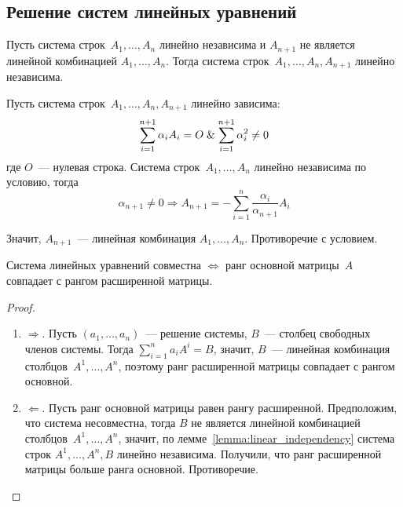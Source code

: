 \subsection{Решение систем линейных уравнений}
\begin{lemma}
\label{lemma:linear_independency}
Пусть система строк~$A_1, \ldots, A_n$ линейно независима и $A_{n+1}$ не является линейной комбинацией $A_1, \ldots, A_n$. Тогда система строк~$A_1, \ldots, A_n, A_{n+1}$ линейно независима.
\end{lemma}
\begin{proofcontra}
Пусть система строк~$A_1, \ldots, A_n, A_{n+1}$ линейно зависима:
\begin{equation*}
\sum_{i=1}^{n+1} \alpha_i A_i = O \mathrel{\&}
\sum_{i=1}^{n+1} \alpha_i^2 \neq 0
\end{equation*}
где $O$~--- нулевая строка.
Система строк~$A_1, \ldots, A_n$ линейно независима по условию, тогда
\begin{equation*}
\alpha_{n+1} \neq 0 \Rightarrow A_{n+1} = -\sum_{i=1}^n \frac{\alpha_i}{\alpha_{n+1}} A_i
\end{equation*}

Значит, $A_{n+1}$~--- линейная комбинация $A_1, \ldots, A_n$.
Противоречие с условием.
\end{proofcontra}

\begin{theorem}
Система линейных уравнений совместна $\Leftrightarrow$ ранг основной матрицы~$A$ совпадает с рангом расширенной матрицы.
\end{theorem}
\begin{proof}
\begin{enumerate}
	\item $\Rightarrow$. Пусть $(a_1, \ldots, a_n)$~--- решение системы, $B$~--- столбец свободных членов системы.
	Тогда $\sum\limits_{i=1}^n a_i A^i = B$, значит, $B$~--- линейная комбинация столбцов~$A^1, \ldots, A^n$, поэтому ранг расширенной матрицы совпадает с рангом основной.
	
	\item $\Leftarrow$. Пусть ранг основной матрицы равен рангу расширенной.
	Предположим, что система несовместна, тогда $B$ не является линейной комбинацией столбцов~$A^1, \ldots, A^n$, значит, по лемме~\ref*{lemma:linear_independency} система строк $A^1, \ldots, A^n, B$ линейно независима.
	Получили, что ранг расширенной матрицы больше ранга основной.
	Противоречие.
\end{enumerate}
\end{proof}

